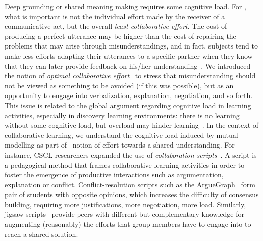 \documentclass[twocolumn]{article}
\begin{document}
Deep grounding or shared meaning making requires some cognitive load. For
\citet{clark1986referring}, what is important is not the individual effort made
by the receiver of a communicative act, but the overall \emph{least collaborative
effort}.  The cost of producing a perfect utterance may be higher than the cost
of repairing the problems that may arise through misunderstandings, and in fact,
subjects tend to make less efforts adapting their utterances to a specific
partner when they know that they can later provide feedback on his/her
understanding~\citep{schober1993spatial}. We introduced the notion of
\emph{optimal collaborative effort}~\citep{dillenbourg1995evolution} to stress
that misunderstanding should not be viewed as something to be avoided (if this
was possible), but as an opportunity to engage into verbalization, explanation,
negotiation, and so forth. This issue is related to the global argument
regarding cognitive load in learning activities, especially in discovery
learning environments: there is no learning without some cognitive load, but
overload may hinder learning~\citep{paas2003cognitive}. In the context of
collaborative learning, we understand the cognitive load induced by mutual
modelling as part of~\citet{schwartz1995emergence} notion of effort towards a
shared understanding. For instance, CSCL researchers expanded the use of
\emph{collaboration scripts}~\citep{kobbe2007specifying}. A script is a pedagogical
method that frames collaborative learning activities in order to foster the
emergence of productive interactions such as argumentation, explanation or
conflict. Conflict-resolution scripts such as the {\sc
ArgueGraph}~\citep{dillenbourg2008mechanics} form pair of students with
opposite opinions, which increases the difficulty of consensus building,
requiring more justifications, more negotiation, more load. Similarly, {\sc
jigsaw} scripts~\citep{aronson1978jigsaw} provide peers with different but
complementary knowledge for augmenting (reasonably) the efforts that group members
have to engage into to reach a shared solution. 
\end{document}
